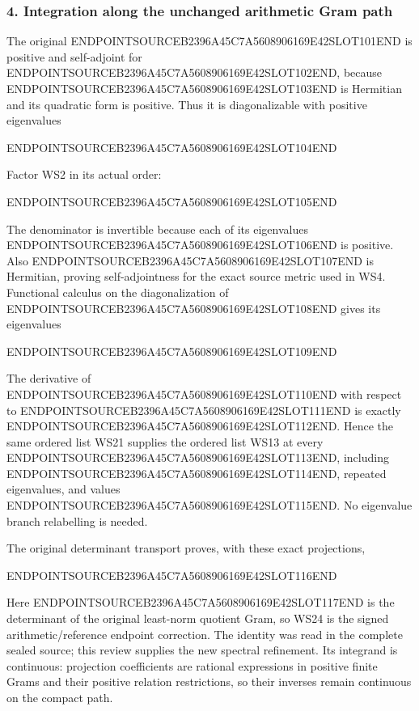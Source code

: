 \subsubsection{4. Integration along the unchanged arithmetic Gram path}\label{endpoint-window_review--integration-along-the-unchanged-arithmetic-gram-path}

The original ENDPOINTSOURCEB2396A45C7A5608906169E42SLOT101END is positive and self-adjoint for ENDPOINTSOURCEB2396A45C7A5608906169E42SLOT102END, because ENDPOINTSOURCEB2396A45C7A5608906169E42SLOT103END is Hermitian and its quadratic form is positive. Thus it is diagonalizable with positive eigenvalues

ENDPOINTSOURCEB2396A45C7A5608906169E42SLOT104END

Factor WS2 in its actual order:

ENDPOINTSOURCEB2396A45C7A5608906169E42SLOT105END

The denominator is invertible because each of its eigenvalues ENDPOINTSOURCEB2396A45C7A5608906169E42SLOT106END is positive. Also ENDPOINTSOURCEB2396A45C7A5608906169E42SLOT107END is Hermitian, proving self-adjointness for the exact source metric used in WS4. Functional calculus on the diagonalization of ENDPOINTSOURCEB2396A45C7A5608906169E42SLOT108END gives its eigenvalues

ENDPOINTSOURCEB2396A45C7A5608906169E42SLOT109END

The derivative of ENDPOINTSOURCEB2396A45C7A5608906169E42SLOT110END with respect to ENDPOINTSOURCEB2396A45C7A5608906169E42SLOT111END is exactly ENDPOINTSOURCEB2396A45C7A5608906169E42SLOT112END. Hence the same ordered list WS21 supplies the ordered list WS13 at every ENDPOINTSOURCEB2396A45C7A5608906169E42SLOT113END, including ENDPOINTSOURCEB2396A45C7A5608906169E42SLOT114END, repeated eigenvalues, and values ENDPOINTSOURCEB2396A45C7A5608906169E42SLOT115END. No eigenvalue branch relabelling is needed.

The original determinant transport proves, with these exact projections,

ENDPOINTSOURCEB2396A45C7A5608906169E42SLOT116END

Here ENDPOINTSOURCEB2396A45C7A5608906169E42SLOT117END is the determinant of the original least-norm quotient Gram, so WS24 is the signed arithmetic/reference endpoint correction. The identity was read in the complete sealed source; this review supplies the new spectral refinement. Its integrand is continuous: projection coefficients are rational expressions in positive finite Grams and their positive relation restrictions, so their inverses remain continuous on the compact path.

